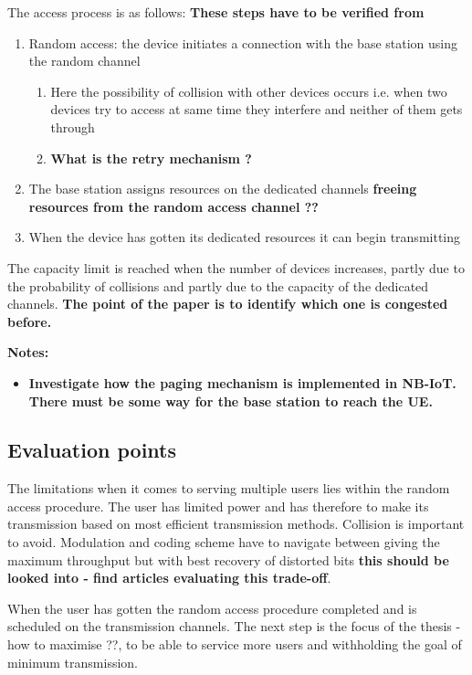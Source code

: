 \documentclass[10pt,a4paper,titlepage,twoside]{article}
\newcommand{\hh}[1]{\textbf{\color{ymaorng} #1}}
\newcommand{\point}[1]{\textbf{\color{ymared} #1}}
\begin{document}
The access process is as follows: \hh{These steps have to be verified from \cite{3gpp}}
\begin{enumerate}
  \item Random access: the device initiates a connection with the base station using the random channel
  \begin{enumerate}
    \item Here the possibility of collision with other devices occurs i.e. when two devices try to access at same time they interfere and neither of them gets through
    \item \hh{What is the retry mechanism ?}
  \end{enumerate}
  \item The base station assigns resources on the dedicated channels \point{freeing resources from the random access channel ??}
  \item When the device has gotten its dedicated resources it can begin transmitting
\end{enumerate}

The capacity limit is reached when the number of devices increases, partly due to the probability of collisions and partly due to the capacity of the dedicated channels. \hh{The point of the paper is to identify which one is congested before.}

\point{Notes:}\vspace{-4mm}
\begin{itemize}
  \item \hh{Investigate how the paging mechanism is implemented in NB-IoT. There must be some way for the base station to reach the UE.}
\end{itemize}



\subsection{Evaluation points}

The limitations when it comes to serving multiple users lies within the random access procedure. The user has limited power and has therefore to make its transmission based on most efficient transmission methods. Collision is important to avoid. Modulation and coding scheme have to navigate between giving the maximum throughput but with best recovery of distorted bits \point{this should be looked into - find articles evaluating this trade-off}.

When the user has gotten the random access procedure completed and is scheduled on the transmission channels. The next step is the focus of the thesis - how to maximise ??, to be able to service more users and withholding the goal of minimum transmission.
\end{document}

